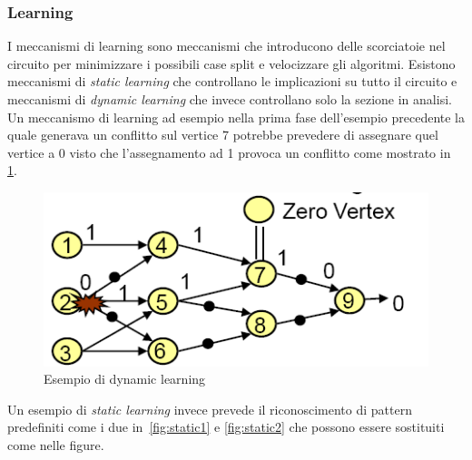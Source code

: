\subsubsection{Learning}
I meccanismi di learning sono meccanismi che introducono delle scorciatoie nel circuito per minimizzare i possibili case split e velocizzare gli algoritmi. Esistono meccanismi di \emph{static learning} che controllano le implicazioni su tutto il circuito e meccanismi di \emph{dynamic learning} che invece controllano solo la sezione in analisi.\\
Un meccanismo di learning ad esempio nella prima fase dell'esempio precedente la quale generava un conflitto sul vertice 7 potrebbe prevedere di assegnare quel vertice a 0 visto che l'assegnamento ad 1 provoca un conflitto come mostrato in \figurename\,\ref{fig:firstlearning}.\\
\begin{figure}
\centering
\includegraphics[scale=0.6]{img/firstlearning.png}
\caption{Esempio di dynamic learning}\label{fig:firstlearning}
\end{figure}
Un esempio di \emph{static learning} invece prevede il riconoscimento di pattern predefiniti come i due in \figurename\,\ref{fig:static1} e \ref{fig:static2} che possono essere sostituiti come nelle figure.
